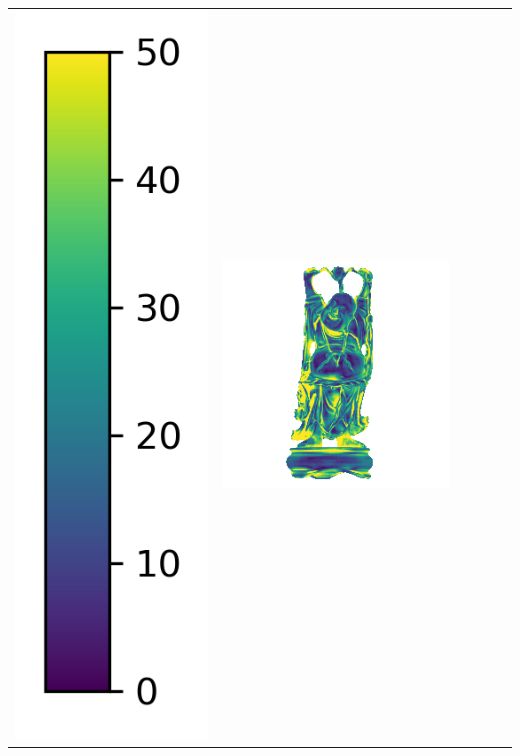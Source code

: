 \begin{tabularx}{\linewidth}{@{}Y@{}Y@{}Y@{}Y@{}Y@{}Y@{}}
\includegraphics[width=0.2\linewidth]{semisynthetic/colorbar_error_vertical.png} &
\includegraphics[width=\linewidth]{semisynthetic/20160617_20_ours_err.png} &

\end{tabularx}
